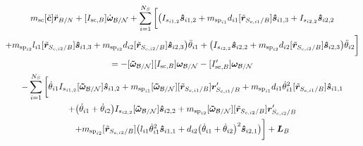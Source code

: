 \documentclass[paper]{aiaaNew}
\begin{document}
	\begin{multline}
m_{\text{sc}} [\tilde{\bm{c}}] \ddot{\bm r}_{B/N} + [I_{\text{sc},B}] \dot{\bm\omega}_{\cal B/N} + \sum\limits_{i=1}^{N_S} \bigg[  \big(I_{s_{i1,2}}\bm{\hat{s}}_{i1,2}+m_{\text{sp}_{i1}}d_{i1} [\tilde{\bm{r}}_{S_{c,i1}/B}]   \bm{\hat{s}}_{i1,3} + I_{s_{i2,2}}\bm{\hat{s}}_{i2,2}\\
+m_{\text{sp}_{i2}}l_{i1} [\tilde{\bm{r}}_{S_{c,i2}/B}]  \bm{\hat{s}}_{i1,3}+m_{\text{sp}_{i2}}d_{i2} [\tilde{\bm{r}}_{S_{c,i2}/B}] \bm{\hat{s}}_{i2,3}\big) \ddot{\theta}_{i1}
+\big( I_{s_{i2,2}}\bm{\hat{s}}_{i2,2}+m_{\text{sp}_{i2}} d_{i2} [\tilde{\bm{r}}_{S_{c,i2}/B}] \bm{\hat{s}}_{i2,3}\big)\ddot{\theta}_{i2}\bigg] \\
= -[\bm{\tilde{\omega}}_{\cal B/N}] [I_{\text{sc},B}] \bm\omega_{\cal B/N} - [I'_{\text{sc},B}] \bm\omega_{\cal B/N} \\
-  \sum\limits_{i=1}^{N_S} \bigg[
\dot{\theta}_{i1} I_{s_{i1,2}} [\bm{\tilde{\omega}}_{\cal B/N}] \bm{\hat{s}}_{i1,2} 
+m_{\text{sp}_{i1}} [\bm{\tilde{\omega}}_{\cal B/N}] [\tilde{\bm{r}}_{S_{c,i1}/B}] \bm{r}'_{S_{c,i1}/B} +m_{\text{sp}_{i1}}d_{i1}\dot{\theta}_{i1}^2  [\tilde{\bm{r}}_{S_{c,i1}/B}] \bm{\hat{s}}_{i1,1}\\
+ \big(\dot{\theta}_{i1}+\dot{\theta}_{i2}\big) I_{s_{i2,2}}[\bm{\tilde{\omega}}_{\cal B/N}]\bm{\hat{s}}_{i2,2}
+m_{\text{sp}_{i2}} [\bm{\tilde{\omega}}_{\cal B/N}] [\tilde{\bm{r}}_{S_{c,i2}/B}] \bm{r}'_{S_{c,i2}/B} 	\\+m_{\text{sp}_{i2}} [\tilde{\bm{r}}_{S_{c,i2}/B}] \big(l_{i1} \dot{\theta}_{i1}^2 \bm{\hat{s}}_{i1,1} + d_{i2}\big(\dot{\theta}_{i1} + \dot{\theta}_{i2}\big)^2\bm{\hat{s}}_{i2,1}\big)\bigg]
+ \bm{L}_B 
\label{eq:Final7}
\end{multline}
\end{document}
